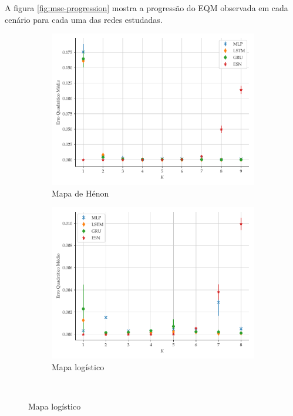 \documentclass[a4paper, 12pt]{article}
\begin{document}
A figura \ref{fig:mse-progression} mostra a progressão do EQM observada em cada cenário para cada uma das redes estudadas. 
\begin{figure}[!ht]
     \begin{subfigure}[t]{0.45\textwidth} 
     \centering
         \includegraphics[scale=0.39]{progressao-k-henon.pdf}
         \caption{Mapa de Hénon}
     \end{subfigure}
     \centering
     \begin{subfigure}[t]{0.45\textwidth} 
     \centering
         \includegraphics[scale=0.39]{progressao-k-logistic.pdf}
         \caption{Mapa logístico}
     \end{subfigure}
     \\

\end{figure}
\end{document}

